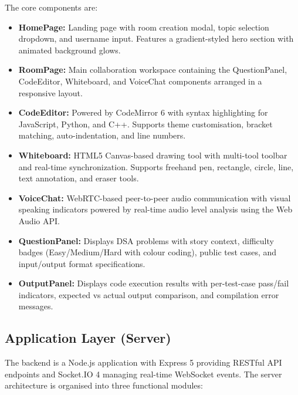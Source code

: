 The core components are:

\begin{itemize}
    \item \textbf{HomePage:} Landing page with room creation modal, topic selection dropdown, and username input. Features a gradient-styled hero section with animated background glows.
    \item \textbf{RoomPage:} Main collaboration workspace containing the QuestionPanel, CodeEditor, Whiteboard, and VoiceChat components arranged in a responsive layout.
    \item \textbf{CodeEditor:} Powered by CodeMirror 6 with syntax highlighting for JavaScript, Python, and C++. Supports theme customisation, bracket matching, auto-indentation, and line numbers.
    \item \textbf{Whiteboard:} HTML5 Canvas-based drawing tool with multi-tool toolbar and real-time synchronization. Supports freehand pen, rectangle, circle, line, text annotation, and eraser tools.
    \item \textbf{VoiceChat:} WebRTC-based peer-to-peer audio communication with visual speaking indicators powered by real-time audio level analysis using the Web Audio API.
    \item \textbf{QuestionPanel:} Displays DSA problems with story context, difficulty badges (Easy/Medium/Hard with colour coding), public test cases, and input/output format specifications.
    \item \textbf{OutputPanel:} Displays code execution results with per-test-case pass/fail indicators, expected vs actual output comparison, and compilation error messages.
\end{itemize}

\subsection{Application Layer (Server)}

The backend is a Node.js application with Express 5 providing RESTful API endpoints and Socket.IO 4 managing real-time WebSocket events. The server architecture is organised into three functional modules:


